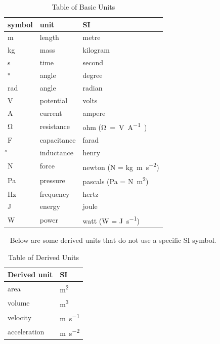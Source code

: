 \documentclass[12pt]{article}
\begin{document}
\renewcommand{\arraystretch}{1.2}
	\begin{table}[H]
	  \noindent\begin{tabular}{l l l} 
	    \toprule		
	    \textbf{symbol} & \textbf{unit} & \textbf{SI}\\
	    \midrule 
	    \si{\metre} & length & metre\\
	    \si{\kilogram} & mass	& kilogram\\
	    \si{\second} & time & second\\
	    \si{\degree} & angle & degree\\
	    \si{\radian} & angle & radian\\
	    \si{\V} & potential & volts\\
	    \si{\ampere} & current & ampere\\
	    \si{\ohm} & resistance & ohm (\si\ohm = \si{\V\per\ampere})\\
	    \si{\F} & capacitance & farad\\
	    \si{\H} & inductance & henry\\
	    N & force & newton (N = \si{\kilogram\metre\per\square\second})\\
	    Pa & pressure & pascals (Pa = N\si{\per\square\metre})\\
	    \si{\Hz} & frequency & hertz\\
	    \si{\joule} & energy & joule\\
	    \si{\watt} & power & watt (W = \si{\joule\per\second})\\
	    \bottomrule
	  \end{tabular}
	\caption{\label{tabUnit}Table of Basic Units}
	\end{table}  
  ~\newline
Below are some derived units that do not use a specific SI symbol.
~\newline

  \renewcommand{\arraystretch}{1.2}
\begin{table}[H]
	 \noindent \begin{tabular}{l l} 
	    \toprule		
	    \textbf{Derived unit} & \textbf{SI}\\
	    \midrule 
	    area  & \si{\square\metre}\\
	    volume & \si{\cubic\metre}\\
	    velocity &  \si{\metre\per\second}\\
	    acceleration &  \si{\metre\per\square\second}\\    
	    \bottomrule
	  \end{tabular}
	\caption{\label{devUnit}Table of Derived Units}  
\end{table}
\end{document}
